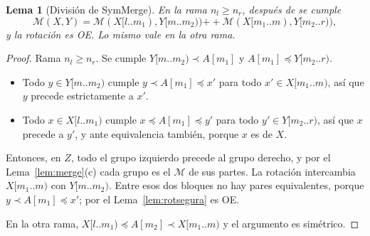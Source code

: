\documentclass[10pt,a4paper]{article}
\theoremstyle{plain}
\newtheorem{lema}[teorema]{Lema}
\theoremstyle{definition}
\theoremstyle{remark}
\newcommand{\lt}{\prec}
\newcommand{\les}{\preccurlyeq}
\newcommand{\cat}{\mathbin{+\!\!+}}
\newcommand{\Mrg}{\mathcal{M}}
\begin{document}
\begin{lema}[División de SymMerge]\label{lem:symsplit}
En la rama $n_l\ge n_r$, después de \Rotar se cumple
\[
\Mrg(X,Y)=\Mrg(X[l..m_1),Y[m..m_2))\cat\Mrg(X[m_1..m),Y[m_2..r)),
\]
y la rotación es OE. Lo mismo vale en la otra rama.
\end{lema}
\begin{proof}
Rama $n_l\ge n_r$. Se cumple $Y[m..m_2)\lt A[m_1]$ y $A[m_1]\les Y[m_2..r)$.
\begin{itemize}[nosep]
\item Todo $y\in Y[m..m_2)$ cumple $y\lt A[m_1]\les x'$ para todo
  $x'\in X[m_1..m)$, así que $y$ precede estrictamente a $x'$.
\item Todo $x\in X[l..m_1)$ cumple $x\les A[m_1]\les y'$ para todo
  $y'\in Y[m_2..r)$, así que $x$ precede a $y'$, y ante equivalencia también, porque
  $x$ es de $X$.
\end{itemize}
Entonces, en $Z$, todo el grupo izquierdo precede al grupo derecho, y por el
Lema~\ref{lem:merge}(c) cada grupo es el $\Mrg$ de sus partes. La rotación intercambia
$X[m_1..m)$ con $Y[m..m_2)$. Entre esos dos bloques no hay pares equivalentes, porque
$y\lt A[m_1]\les x'$; por el Lema~\ref{lem:rotsegura} es OE.

En la otra rama, $X[l..m_1)\les A[m_2]\lt X[m_1..m)$ y el argumento es simétrico.
\end{proof}
\end{document}

